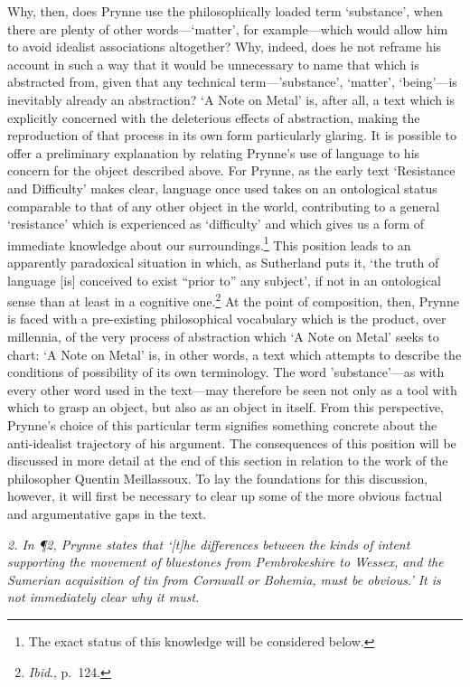 \documentclass[]{article}
\begin{document}
Why, then, does Prynne use the philosophically loaded term `substance',
when there are plenty of other words---`matter', for example---which
would allow him to avoid idealist associations altogether? Why, indeed,
does he not reframe his account in such a way that it would be
unnecessary to name that which is abstracted from, given that any
technical term---'substance', `matter', `being'---is inevitably already
an abstraction? `A Note on Metal' is, after all, a text which is
explicitly concerned with the deleterious effects of abstraction, making
the reproduction of that process in its own form particularly glaring.
It is possible to offer a preliminary explanation by relating Prynne's
use of language to his concern for the object described above. For
Prynne, as the early text `Resistance and Difficulty' makes clear,
language once used takes on an ontological status comparable to that of
any other object in the world, contributing to a general `resistance'
which is experienced as `difficulty' and which gives us a form of
immediate knowledge about our surroundings.\footnote{The exact status of
  this knowledge will be considered below.} This position leads to an
apparently paradoxical situation in which, as Sutherland puts it, `the
truth of language {[}is{]} conceived to exist ``prior to'' any subject',
if not in an ontological sense than at least in a cognitive
one.\footnote{\emph{Ibid}., p.~124.} At the point of composition, then,
Prynne is faced with a pre-existing philosophical vocabulary which is
the product, over millennia, of the very process of abstraction which `A
Note on Metal' seeks to chart: `A Note on Metal' is, in other words, a
text which attempts to describe the conditions of possibility of its own
terminology. The word 'substance'---as with every other word used in the
text---may therefore be seen not only as a tool with which to grasp an
object, but also as an object in itself. From this perspective, Prynne's
choice of this particular term signifies something concrete about the
anti-idealist trajectory of his argument. The consequences of this
position will be discussed in more detail at the end of this section in
relation to the work of the philosopher Quentin Meillassoux. To lay the
foundations for this discussion, however, it will first be necessary to
clear up some of the more obvious factual and argumentative gaps in the
text.

\emph{2. In ¶2, Prynne states that `{[}t{]}he differences between the
kinds of intent supporting the movement of bluestones from Pembrokeshire
to Wessex, and the Sumerian acquisition of tin from Cornwall or Bohemia,
must be obvious.' It is not immediately clear why it must.}
\end{document}
